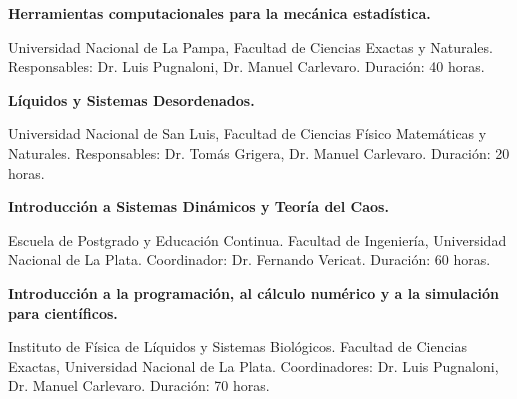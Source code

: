   \textbf{Herramientas computacionales para la mecánica estadística.}

Universidad Nacional de La Pampa, Facultad de Ciencias Exactas y Naturales. Responsables: Dr. Luis Pugnaloni, Dr. Manuel Carlevaro. Duración: 40 horas.

 
 \textbf{Líquidos y Sistemas Desordenados.}

Universidad Nacional de San Luis, Facultad de Ciencias Físico Matemáticas y Naturales. Responsables: Dr. Tomás Grigera, Dr. Manuel Carlevaro. Duración: 20 horas.


  \textbf{Introducción a Sistemas Dinámicos y Teoría del Caos.}
 
 Escuela de Postgrado y Educación Continua. Facultad de Ingeniería, Universidad Nacional de La Plata. Coordinador: Dr. Fernando Vericat. Duración: 60 horas.
 
  \textbf{Introducción a la programación, al cálculo numérico y a la simulación para científicos.}
 
 Instituto de Física de Líquidos y Sistemas Biológicos. Facultad de Ciencias Exactas, Universidad Nacional de La Plata. Coordinadores: Dr. Luis Pugnaloni, Dr. Manuel Carlevaro. Duración: 70 horas.
